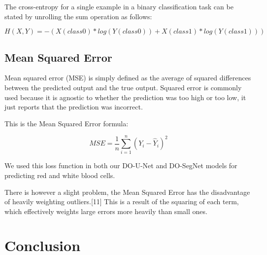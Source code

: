 The cross-entropy for a single example in a binary classification task can be stated by unrolling the sum operation as follows:

\begin{equation}
    H(X, Y) = - (X(class0) * log(Y(class0)) + X(class1) * log(Y(class1)))
\end{equation}

\subsection{Mean Squared Error}
\hspace{\parindent}
Mean squared error (MSE) is simply defined as the average of squared differences between the predicted output and the true output. Squared error is commonly used because it is agnostic to whether the prediction was too high or too low, it just reports that the prediction was incorrect.

This is the Mean Squared Error formula:

\begin{equation}
    MSE = \frac{1}{n} \sum_{i=1}^{n} (Y_{i} - \hat{Y}_{i})^{2}
\end{equation}

We used this loss function in both our DO-U-Net and DO-SegNet models for predicting red and white blood cells.\

There is however a slight problem, the Mean Squared Error has the disadvantage of heavily weighting outliers.[11] This is a result of the squaring of each term, which effectively weights large errors more heavily than small ones.

\section{Conclusion}
\vspace{0.2in}
\hspace{\parindent}

\newpage
